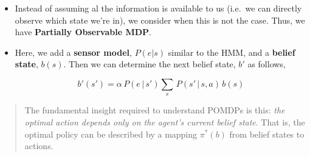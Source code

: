 \documentclass[
]{book}
\begin{document}
\begin{itemize}
\item
  Instead of assuming al the information is available to us (i.e.~we can
  directly observe which state we're in), we consider when this is not
  the case. Thus, we have \textbf{Partially Observable MDP}.
\item
  Here, we add a \textbf{sensor model}, \(P(e|s)\) similar to the HMM,
  and a \textbf{belief state}, \(b(s)\). Then we can determine the next
  belief state, \(b'\) as follows,

  \[
  b'(s')=\alpha\,P(e\,|\,s')\sum_{s}\,P(s'\,|\,s,a)\,b(s)
  \]
\end{itemize}

\begin{quote}
The fundamental insight required to understand POMDPs is this: \emph{the
optimal action depends only on the agent's current belief state}. That
is, the optimal policy can be described by a mapping \(\pi^*(b)\) from
belief states to actions.
\end{quote}
\end{document}
